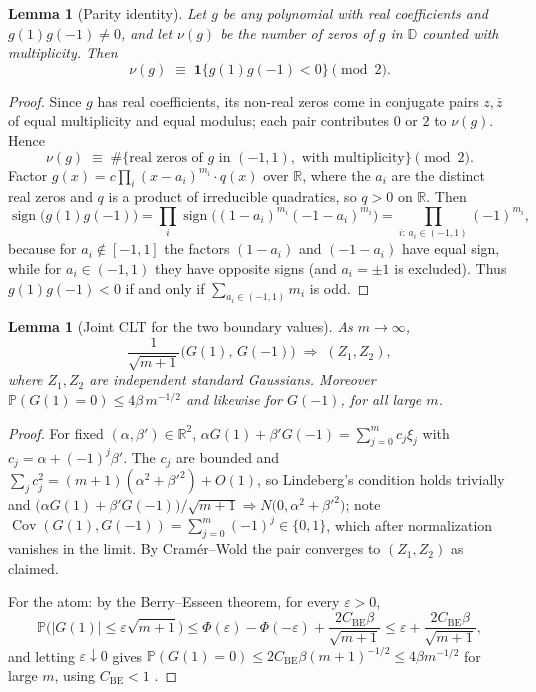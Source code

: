 \documentclass[11pt]{article}
\newtheorem{lemma}[theorem]{Lemma}
\newcommand{\D}{\mathbb{D}}
\newcommand{\PP}{\mathbb{P}}
\begin{document}
\begin{lemma}[Parity identity]\label{lem:parity}
Let $g$ be any polynomial with real coefficients and $g(1)g(-1)\ne0$, and let
$\nu(g)$ be the number of zeros of $g$ in $\D$ counted with multiplicity.  Then
\[
\nu(g)\;\equiv\;\mathbf 1\{g(1)g(-1)<0\}\pmod 2 .
\]
\end{lemma}

\begin{proof}
Since $g$ has real coefficients, its non-real zeros come in conjugate pairs
$z,\bar z$ of equal multiplicity and equal modulus; each pair contributes $0$ or
$2$ to $\nu(g)$.  Hence
\[
\nu(g)\;\equiv\;\#\{\text{real zeros of }g\text{ in }(-1,1),
\text{ with multiplicity}\}\pmod2 .
\]
Factor $g(x)=c\prod_i(x-a_i)^{m_i}\cdot q(x)$ over $\mathbb R$, where the $a_i$
are the distinct real zeros and $q$ is a product of irreducible quadratics, so
$q>0$ on $\mathbb R$.  Then
\[
\operatorname{sign}\bigl(g(1)g(-1)\bigr)
=\prod_i\operatorname{sign}\bigl((1-a_i)^{m_i}(-1-a_i)^{m_i}\bigr)
=\prod_{i:\,a_i\in(-1,1)}(-1)^{m_i},
\]
because for $a_i\notin[-1,1]$ the factors $(1-a_i)$ and $(-1-a_i)$ have equal
sign, while for $a_i\in(-1,1)$ they have opposite signs (and $a_i=\pm1$ is
excluded).  Thus $g(1)g(-1)<0$ if and only if
$\sum_{a_i\in(-1,1)}m_i$ is odd.
\end{proof}

\begin{lemma}[Joint CLT for the two boundary values]\label{lem:clt}
As $m\to\infty$,
\[
\frac{1}{\sqrt{m+1}}\bigl(G(1),\,G(-1)\bigr)
\;\Longrightarrow\;(Z_1,Z_2),
\]
where $Z_1,Z_2$ are independent standard Gaussians.  Moreover
$\PP(G(1)=0)\le 4\beta\,m^{-1/2}$ and likewise for $G(-1)$, for all large $m$.
\end{lemma}

\begin{proof}
For fixed $(\alpha,\beta')\in\mathbb R^2$,
$\alpha G(1)+\beta'G(-1)=\sum_{j=0}^m c_j\xi_j$ with
$c_j=\alpha+(-1)^j\beta'$.  The $c_j$ are bounded and
$\sum_jc_j^2=(m+1)(\alpha^2+\beta'^2)+O(1)$, so Lindeberg's condition holds
trivially and
$\bigl(\alpha G(1)+\beta'G(-1)\bigr)/\sqrt{m+1}\Rightarrow
N\bigl(0,\alpha^2+\beta'^2\bigr)$; note
$\operatorname{Cov}(G(1),G(-1))=\sum_{j=0}^m(-1)^j\in\{0,1\}$, which after
normalization vanishes in the limit.  By Cram\'er--Wold the pair converges to
$(Z_1,Z_2)$ as claimed.

For the atom: by the Berry--Esseen theorem, for every $\varepsilon>0$,
\[
\PP\bigl(|G(1)|\le\varepsilon\sqrt{m+1}\bigr)
\le\Phi(\varepsilon)-\Phi(-\varepsilon)+\frac{2C_{\mathrm{BE}}\beta}{\sqrt{m+1}}
\le\varepsilon+\frac{2C_{\mathrm{BE}}\beta}{\sqrt{m+1}},
\]
and letting $\varepsilon\downarrow0$ gives
$\PP(G(1)=0)\le2C_{\mathrm{BE}}\beta(m+1)^{-1/2}\le4\beta m^{-1/2}$ for large
$m$, using $C_{\mathrm{BE}}<1$ \cite{Shevtsova}.
\end{proof}
\end{document}
